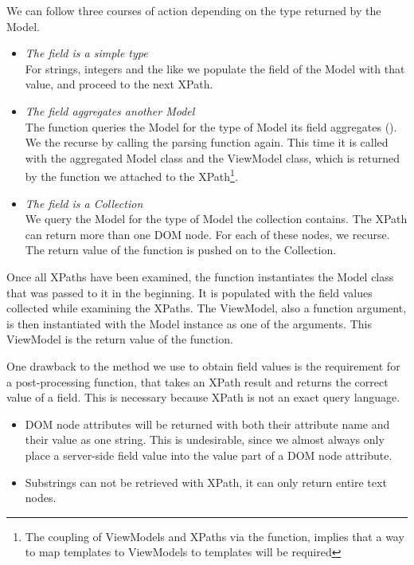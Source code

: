 \documentclass[thesis.tex]{subfiles}
\begin{document}
We can follow three courses of action depending on the type
returned by the Model.
\begin{itemize}
	\item \emph{The field is a simple type}\\
	For strings, integers and the like we populate the field of the Model
	with that value, and proceed to the next XPath.
	\item \emph{The field aggregates another Model}\\
	The function queries the Model for the type of Model its field aggregates
	().
	We the recurse by calling the parsing function again.
	This time it is called with the aggregated Model class and
	the ViewModel class, which is returned by the  function
	we attached to the XPath\footnote{The coupling of ViewModels and XPaths
	via the  function, implies that a way to map templates to
	ViewModels to templates will be required}.
	\item \emph{The field is a Collection}\\
	We query the Model for the type of Model the collection contains.
	The XPath can return more than one DOM node.
	For each of these nodes, we recurse.
	The return value of the function is pushed on to the Collection.
\end{itemize}

Once all XPaths have been examined, the function instantiates the Model class
that was passed to it in the beginning. It is populated with the field values
collected while examining the XPaths.
The ViewModel, also a function argument, is then instantiated with
the Model instance as one of the arguments.
This ViewModel is the return value of the function.

One drawback to the method we use to obtain field values is the requirement
for a post-processing function, that takes an XPath result and
returns the correct value of a field.
This is necessary because XPath is not an exact query language.
\begin{itemize}
	\item DOM node attributes will be returned with both their attribute name and
	their value as one string. This is undesirable, since we almost always only
	place a server-side field value into the value part of a DOM node attribute.
	\item Substrings can not be retrieved with XPath, it can only return entire
	text nodes.
\end{itemize}
\end{document}
